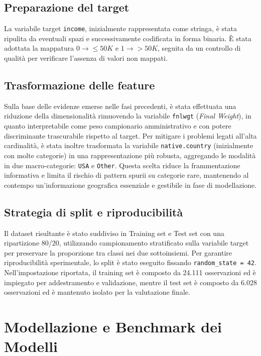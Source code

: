 \documentclass[a4paper,11pt]{article}
\begin{document}
\subsection{Preparazione del target}
La variabile target \texttt{income}, inizialmente rappresentata come stringa, è stata ripulita da eventuali spazi e successivamente codificata in forma binaria. 
È stata adottata la mappatura \(0 \rightarrow \leq 50K\) e \(1 \rightarrow >50K\), seguita da un controllo di qualità per verificare l’assenza di valori non mappati. 

\subsection{Trasformazione delle feature}
Sulla base delle evidenze emerse nelle fasi precedenti, è stata effettuata una riduzione della dimensionalità rimuovendo la variabile \texttt{fnlwgt} (\textit{Final Weight}), in quanto interpretabile come peso campionario amministrativo e con potere discriminante trascurabile rispetto al target. 
Per mitigare i problemi legati all’alta cardinalità, è stata inoltre trasformata la variabile \texttt{native.country} (inizialmente con molte categorie) in una rappresentazione più robusta, aggregando le modalità in due macro-categorie: \texttt{USA} e \texttt{Other}. 
Questa scelta riduce la frammentazione informativa e limita il rischio di pattern spurii su categorie rare, mantenendo al contempo un’informazione geografica essenziale e gestibile in fase di modellazione. 

\subsection{Strategia di split e riproducibilità}
Il dataset risultante è stato suddiviso in Training set e Test set con una ripartizione 80/20, utilizzando campionamento stratificato sulla variabile target per preservare la proporzione tra classi nei due sottoinsiemi. 
Per garantire riproducibilità sperimentale, lo split è stato eseguito fissando \texttt{random\_state = 42}. 
Nell’impostazione riportata, il training set è composto da 24.111 osservazioni ed è impiegato per addestramento e validazione, mentre il test set è composto da 6.028 osservazioni ed è mantenuto isolato per la valutazione finale. 


\newpage
\section{Modellazione e Benchmark dei Modelli}
\end{document}

